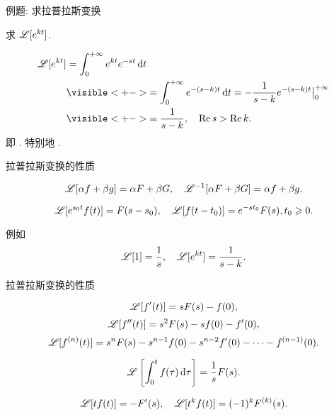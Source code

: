 \begin{frame}{例题: 求拉普拉斯变换}
\begin{example}
求 $\mathscr{L}[e^{kt}]$.
\end{example}
\begin{solution}
\vspace{-\baselineskip}
\begin{align*}
\msl[e^{kt}]&=\int_0^{+\infty}e^{kt}e^{-st}\diff t\\
&\visible<+->{=\int_0^{+\infty}e^{-(s-k)t}\diff t
=-\frac1{s-k}e^{-(s-k)t}\big|_0^{+\infty}}\\
&\visible<+->{=\frac1{s-k}, \quad\Re s>\Re k.}
\end{align*}
\onslide<+->
即 .
\onslide<+->
特别地 .
\end{solution}
\end{frame}


\begin{frame}{拉普拉斯变换的性质}
\begin{theorem}[线性性质]
\[\mathscr{L}[\alpha f+\beta g]=\alpha F+\beta G,\quad
\mathscr{L}^{-1}[\alpha F+\beta G]=\alpha f+\beta g.\]
\end{theorem}

\begin{theorem}[延迟性质和位移性质]
\[\mathscr{L}[e^{s_0t}f(t)]=F(s-s_0),\quad
\mathscr{L}[f(t-t_0)]=e^{-st_0}F(s), t_0\geqslant 0.\]
\end{theorem}

\onslide<+->
例如
\[\mathscr{L}[1]=\frac1s,\quad\mathscr{L}[e^{kt}]=\frac1{s-k}.\]
\end{frame}


\begin{frame}{拉普拉斯变换的性质}
\begin{conclusion}[微分性质]
\vspace{-\baselineskip}
\[\mathscr{L}[f'(t)]=sF(s)-f(0),\]
\[\mathscr{L}[f''(t)]=s^2F(s)-sf(0)-f'(0),\]
\[\mathscr{L}[f^{(n)}(t)]=s^nF(s)-s^{n-1}f(0)-s^{n-2}f'(0)-\cdots-f^{(n-1)}(0).\]
\end{conclusion}

\begin{theorem}[积分性质]
\vspace{-\baselineskip}
\[\mathscr{L}\left[\int_0^t f(\tau)\,\mathrm{d}\tau\right]=\frac 1s F(s).\]
\end{theorem}

\begin{theorem}[乘多项式性质]
\vspace{-\baselineskip}
\[\mathscr{L}[tf(t)]=-F'(s),\quad\mathscr{L}[t^kf(t)]=(-1)^kF^{(k)}(s).\]
\end{theorem}
\end{frame}


